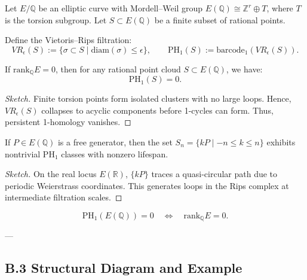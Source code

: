 Let \( E/\mathbb{Q} \) be an elliptic curve with Mordell--Weil group \( E(\mathbb{Q}) \cong \mathbb{Z}^r \oplus T \),  
where \( T \) is the torsion subgroup. Let \( S \subset E(\mathbb{Q}) \) be a finite subset of rational points.

\begin{definition}
Define the Vietoris--Rips filtration:
\[
VR_\epsilon(S) := \{ \sigma \subset S \mid \text{diam}(\sigma) \leq \epsilon \}, \qquad
\mathrm{PH}_1(S) := \text{barcode}_1(VR_\epsilon(S)).
\]
\end{definition}

\begin{theorem}
If \( \mathrm{rank}_{\mathbb{Q}} E = 0 \), then for any rational point cloud \( S \subset E(\mathbb{Q}) \), we have:
\[
\mathrm{PH}_1(S) = 0.
\]
\end{theorem}

\begin{proof}[Sketch]
Finite torsion points form isolated clusters with no large loops.  
Hence, \( VR_\epsilon(S) \) collapses to acyclic components before 1-cycles can form.  
Thus, persistent 1-homology vanishes.
\end{proof}

\begin{lemma}
If \( P \in E(\mathbb{Q}) \) is a free generator, then the set \( S_n = \{ kP \mid -n \leq k \leq n \} \)  
exhibits nontrivial \( \mathrm{PH}_1 \) classes with nonzero lifespan.
\end{lemma}

\begin{proof}[Sketch]
On the real locus \( E(\mathbb{R}) \), \( \{kP\} \) traces a quasi-circular path due to periodic Weierstrass coordinates.  
This generates loops in the Rips complex at intermediate filtration scales.
\end{proof}

\begin{corollary}
\[
\mathrm{PH}_1(E(\mathbb{Q})) = 0 \quad \Leftrightarrow \quad \mathrm{rank}_{\mathbb{Q}}E = 0.
\]
\end{corollary}

---

\subsection*{B.3 Structural Diagram and Example}

